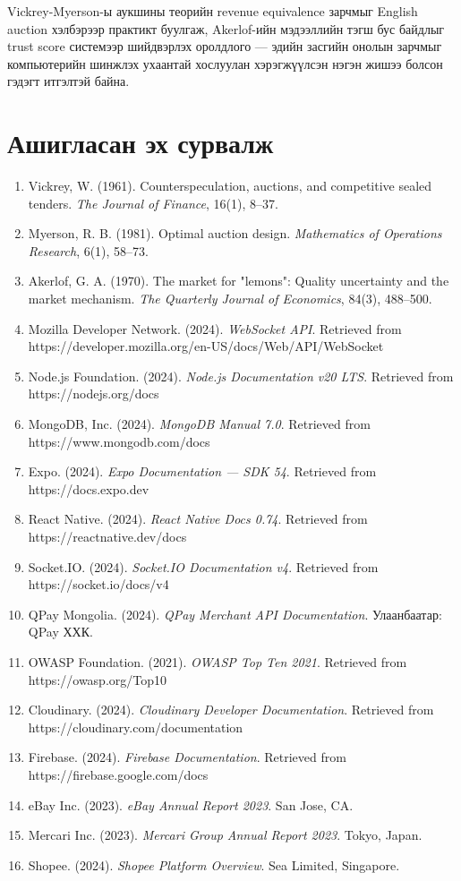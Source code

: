 \documentclass[12pt, a4paper]{report}
\begin{document}
Vickrey-Myerson-ы аукшины теорийн revenue equivalence зарчмыг English auction хэлбэрээр практикт буулгаж, Akerlof-ийн мэдээллийн тэгш бус байдлыг trust score системээр шийдвэрлэх оролдлого — эдийн засгийн онолын зарчмыг компьютерийн шинжлэх ухаантай хослуулан хэрэгжүүлсэн нэгэн жишээ болсон гэдэгт итгэлтэй байна.

\chapter*{Ашигласан эх сурвалж}

\begin{enumerate}
  \item Vickrey, W. (1961). Counterspeculation, auctions, and competitive sealed tenders. \textit{The Journal of Finance}, 16(1), 8--37.
  \item Myerson, R. B. (1981). Optimal auction design. \textit{Mathematics of Operations Research}, 6(1), 58--73.
  \item Akerlof, G. A. (1970). The market for "lemons": Quality uncertainty and the market mechanism. \textit{The Quarterly Journal of Economics}, 84(3), 488--500.
  \item Mozilla Developer Network. (2024). \textit{WebSocket API}. Retrieved from https://developer.mozilla.org/en-US/docs/Web/API/WebSocket
  \item Node.js Foundation. (2024). \textit{Node.js Documentation v20 LTS}. Retrieved from https://nodejs.org/docs
  \item MongoDB, Inc. (2024). \textit{MongoDB Manual 7.0}. Retrieved from https://www.mongodb.com/docs
  \item Expo. (2024). \textit{Expo Documentation --- SDK 54}. Retrieved from https://docs.expo.dev
  \item React Native. (2024). \textit{React Native Docs 0.74}. Retrieved from https://reactnative.dev/docs
  \item Socket.IO. (2024). \textit{Socket.IO Documentation v4}. Retrieved from https://socket.io/docs/v4
  \item QPay Mongolia. (2024). \textit{QPay Merchant API Documentation}. Улаанбаатар: QPay ХХК.
  \item OWASP Foundation. (2021). \textit{OWASP Top Ten 2021}. Retrieved from https://owasp.org/Top10
  \item Cloudinary. (2024). \textit{Cloudinary Developer Documentation}. Retrieved from https://cloudinary.com/documentation
  \item Firebase. (2024). \textit{Firebase Documentation}. Retrieved from https://firebase.google.com/docs
  \item eBay Inc. (2023). \textit{eBay Annual Report 2023}. San Jose, CA.
  \item Mercari Inc. (2023). \textit{Mercari Group Annual Report 2023}. Tokyo, Japan.
  \item Shopee. (2024). \textit{Shopee Platform Overview}. Sea Limited, Singapore.
\end{enumerate}
\end{document}
